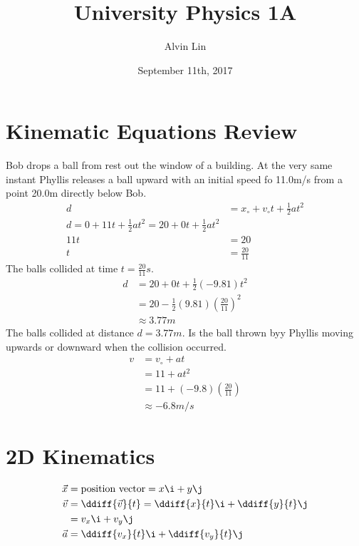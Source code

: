 \documentclass[letterpaper, 12pt]{math}
\title{University Physics 1A}
\author{Alvin Lin}
\date{September 11th, 2017}
\begin{document}
\maketitle

\section*{Kinematic Equations Review}
Bob drops a ball from rest out the window of a building. At the very same
instant Phyllis releases a ball upward with an initial speed fo 11.0m/s
from a point 20.0m directly below Bob.
\begin{align*}
  d &= x_{\circ}+v_{\circ}t+\frac{1}{2}at^2 \\
  d = 0+11t+\frac{1}{2}at^2 = 20+0t+\frac{1}{2}at^2 \\
  11t &= 20 \\
  t &= \frac{20}{11}
\end{align*}
The balls collided at time \( t = \frac{20}{11}s \).
\begin{align*}
  d &= 20+0t+\frac{1}{2}(-9.81)t^2 \\
  &= 20-\frac{1}{2}(9.81)(\frac{20}{11})^2 \\
  &\approx 3.77m
\end{align*}
The balls collided at distance \( d = 3.77m \).
Is the ball thrown byy Phyllis moving upwards or downward when the collision
occurred.
\begin{align*}
  v &= v_{\circ}+at \\
  &= 11+at^2 \\
  &= 11+(-9.8)(\frac{20}{11}) \\
  &\approx -6.8m/s
\end{align*}

\section*{2D Kinematics}
\begin{center}
\end{center}
\begin{align*}
  \vec{x} &= \text{position vector} = x\i+y\j \\
  \vec{v} &= \ddiff{\vec{v}}{t} = \ddiff{x}{t}\i+\ddiff{y}{t}\j \\
  &= v_x\i+v_y\j \\
  \vec{a} &= \ddiff{v_x}{t}\i+\ddiff{v_y}{t}\j
\end{align*}
\end{document}
